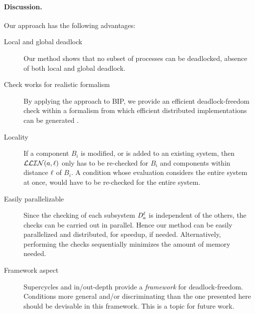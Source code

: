 \paragraph{Discussion.}
Our approach has the following advantages:
\begin{description}

\item[Local and global deadlock] Our method shows that no subset of processes
  can be deadlocked, \ie absence of both local and global deadlock. 

\item[Check works for realistic formalism]   By applying the approach to BIP, we
provide an efficient deadlock-freedom check within a formalism from
which efficient distributed implementations can be generated
\cite{BonakdarpourBJQS10b}.  

\item[Locality] If a component $B_i$ is modified, or is added to an
  existing system, then $\mathcal{LLIN}(a, \ell)$ only has to
  be re-checked for $B_i$ and components within distance $\ell$ of $B_i$.
  A condition whose evaluation considers the entire
  system at once, \eg \cite{AB03,DFinder2,GS03}
  would have to be re-checked for the entire system. 

\item[Easily parallelizable] Since the checking of each subsystem $\mathit{D}_{a}^{\ell}$
  is independent of the others, the checks can be carried out in parallel. Hence
  our method can be easily parallelized and distributed, for speedup, if needed.
  Alternatively, performing the checks sequentially
  minimizes the amount of memory needed. 

\item[Framework aspect] Supercycles and in/out-depth provide a \emph{framework} for
  deadlock-freedom. Conditions more general and/or discriminating than
  the one presented here 
  should be devisable in this framework. This is a topic for future work.

\end{description}


